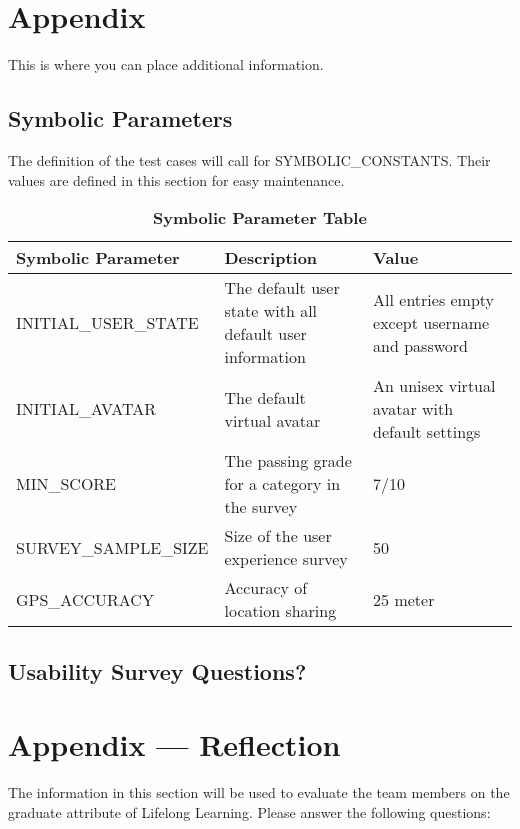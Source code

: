 \documentclass[12pt, titlepage]{article}
\begin{document}
\newpage

\section{Appendix}

This is where you can place additional information.

\subsection{Symbolic Parameters}

The definition of the test cases will call for SYMBOLIC\_CONSTANTS.
Their values are defined in this section for easy maintenance.

\begin{table}[h]
\caption{\bf Symbolic Parameter Table}
\begin{tabular}{|p{0.4\linewidth} | p{0.3\linewidth}| p{0.3\linewidth} |}
\hline
\multicolumn{1}{|l}{\bfseries Symbolic Parameter} & \multicolumn{1}{|l|}{\bfseries Description} & \multicolumn{1}{l|}{\bfseries Value}\\
\hline
INITIAL\_USER\_STATE & The default user state with all default user information & All entries empty except username and password \\
\hline
INITIAL\_AVATAR & The default virtual avatar & An unisex virtual avatar with default settings \\
\hline
MIN\_SCORE & The passing grade for a category in the survey & 7/10\\
\hline
SURVEY\_SAMPLE\_SIZE & Size of the user experience survey & 50\\
\hline
GPS\_ACCURACY & Accuracy of location sharing & 25 meter\\
\hline
\end{tabular}
\end{table}

\subsection{Usability Survey Questions?}
\label{sec:survey}


\newpage{}
\section*{Appendix --- Reflection}

The information in this section will be used to evaluate the team members on the
graduate attribute of Lifelong Learning.  Please answer the following questions:
\end{document}
